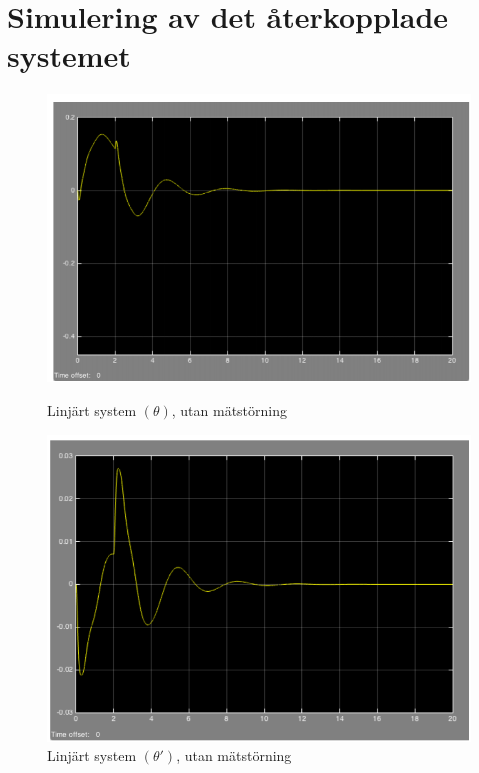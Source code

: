 \documentclass[11pt]{article}
\begin{document}
\section{Simulering av det återkopplade systemet}
\begin{figure}[h!]
\centering
\includegraphics[scale=0.9]{Figures/simlink_1}
\caption{Linjärt system $(\theta)$, utan mätstörning}
\vspace{3em}
\includegraphics[scale=0.9]{Figures/simlink_2}
\caption{Linjärt system $(\theta \prime)$, utan mätstörning}
\end{figure}
\newpage
\end{document}
